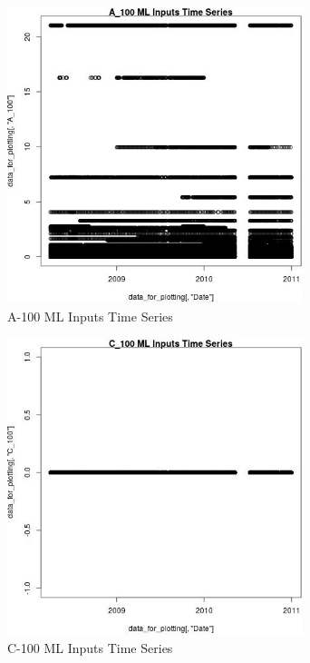 \begin{figure} 
\centering  
\includegraphics[width=0.77\textwidth]{Code_Outputs/ML_input_report_ML_input_PM25_Step5_part_d_de_duplicated_aves_ML_input_A_100vDate.jpg} 
\caption{\label{fig:ML_input_report_ML_input_PM25_Step5_part_d_de_duplicated_aves_ML_inputA_100vDate}A-100 ML Inputs Time Series} 
\end{figure} 
 

\begin{figure} 
\centering  
\includegraphics[width=0.77\textwidth]{Code_Outputs/ML_input_report_ML_input_PM25_Step5_part_d_de_duplicated_aves_ML_input_C_100vDate.jpg} 
\caption{\label{fig:ML_input_report_ML_input_PM25_Step5_part_d_de_duplicated_aves_ML_inputC_100vDate}C-100 ML Inputs Time Series} 
\end{figure} 
 

